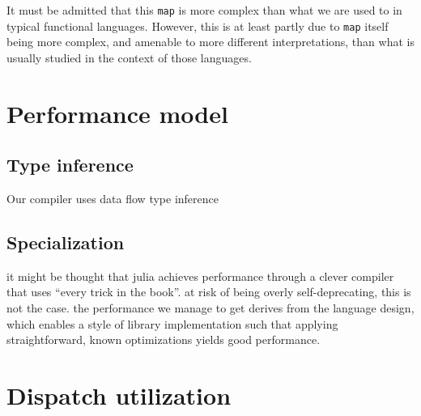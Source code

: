 It must be admitted that this \texttt{map} is more complex than
what we are used to in typical functional languages.
However, this is at least partly due to \texttt{map} itself
being more complex, and amenable to more different interpretations,
than what is usually studied in the context of those languages.


\section{Performance model}

\subsection{Type inference}

Our compiler uses data flow type inference

\cite{kaplanullman}
\cite{abstractinterp}
\cite{graphfree}

\subsection{Specialization}

it might be thought that julia achieves performance through a clever
compiler that uses ``every trick in the book''.
at risk of being overly self-deprecating, this is not the case.
the performance we manage to get derives from the language design,
which enables a style of library implementation such that applying straightforward,
known optimizations yields good performance.

\section{Dispatch utilization}

